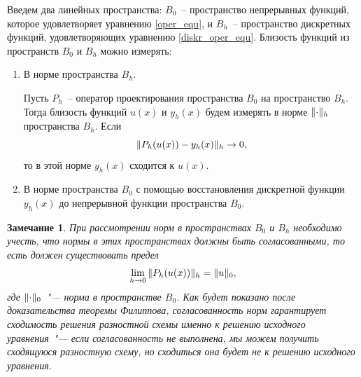 \documentclass[11pt,a4paper,twoside,listtotoc,bibtotoc]{report}
\numberwithin{equation}{section}
\theoremstyle{definition}
\theoremstyle{plain}
\newtheorem*{note*}{Замечание}
\DeclarePairedDelimiter\norm{\lVert}{\rVert}
\begin{document}
Введем два линейных пространства: $B_0$~-- пространство
непрерывных функций, которое удовлетворяет уравнению
\eqref{oper_equ}, и $B_h$~-- пространство дискретных функций, удовлетворяющих уравнению
\eqref{diskr_oper_equ}. Близость функций из пространств $B_0$ и $B_h$ можно измерять:
%
\begin{enumerate}
%
    \item
        В норме пространства $B_h$.

        Пусть $P_h$~-- оператор проектирования пространства $B_0$
        на пространство $B_h$. Тогда близость функций
        $u(x)$ и $y_h(x)$ будем измерять в норме $\norm{\cdot}_h$ пространства $B_h$.
        Если
        $$
            \norm{P_h(u(x))-y_h(x)}_h \rightarrow 0,
        $$
        то в этой норме $y_h(x)$ сходится к $u(x)$.
    \item
        В норме пространства $B_0$ с помощью восстановления
        дискретной функции $y_h(x)$ до непрерывной функции пространства $B_0$.
%
\end{enumerate}
%
\begin{note*}
%
    При рассмотрении норм в пространствах $B_0$ и $B_h$ необходимо учесть,
    что нормы в этих пространствах должны быть согласованными, то есть
    должен существовать предел
    \begin{equation}
        \label{norm_consistency}
        \lim\limits_{h\rightarrow0}{\norm{P_h(u(x))}_h} = \norm{u}_0,
    \end{equation}
    где $\norm{\cdot}_0$~"--- норма в пространстве $B_0$. Как будет показано после
    доказательства теоремы Филиппова, согласованность норм гарантирует сходимость
    решения разностной схемы именно к решению исходного уравнения~"--- если согласованность
    не выполнена, мы можем получить сходящуюся разностную схему, но сходиться она будет
    не к решению исходного уравнения.
%
\end{note*}
%
\end{document}
